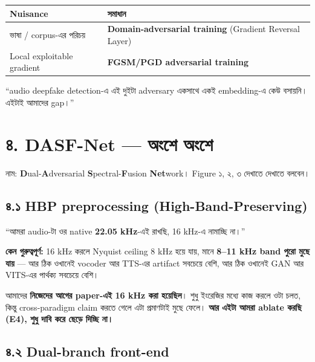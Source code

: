 \documentclass[11pt,a4paper]{article}
\newenvironment{say}{%
  \def\FrameCommand{\textcolor{barcol}{\vrule width 3pt}\hspace{8pt}}%
  \MakeFramed{\advance\hsize-\width \FrameRestore}%
}{\endMakeFramed}
\begin{document}
\begin{center}
\begin{tabularx}{\textwidth}{@{}>{\raggedright\arraybackslash}X >{\raggedright\arraybackslash}X@{}}
\toprule
\textbf{Nuisance} & \textbf{সমাধান} \\
\midrule
ভাষা / corpus-এর পরিচয় & \textbf{Domain-adversarial training} (Gradient Reversal Layer) \\
Local exploitable gradient & \textbf{FGSM/PGD adversarial training} \\
\bottomrule
\end{tabularx}
\end{center}

\begin{say}
``audio deepfake detection-এ এই দুইটা adversary একসাথে একই embedding-এ কেউ
বসায়নি। এইটাই আমাদের gap।''
\end{say}

\section*{৪. DASF-Net --- অংশে অংশে}

নাম: \textbf{D}ual-\textbf{A}dversarial \textbf{S}pectral-\textbf{F}usion
\textbf{Net}work। Figure ১, ২, ৩ দেখাতে দেখাতে বলবেন।

\subsection*{৪.১ HBP preprocessing (High-Band-Preserving)}

\begin{say}
``আমরা audio-টা ওর native \textbf{22.05 kHz}-এই রাখছি, 16 kHz-এ নামাচ্ছি না।''
\end{say}

\textbf{কেন গুরুত্বপূর্ণ:} 16 kHz করলে Nyquist ceiling 8 kHz হয়ে যায়, মানে
\textbf{8--11 kHz band পুরো মুছে যায়} --- আর ঠিক ওখানেই vocoder আর TTS-এর
artifact সবচেয়ে বেশি, আর ঠিক ওখানেই GAN আর VITS-এর পার্থক্য সবচেয়ে বেশি।

আমাদের \textbf{নিজেদের আগের paper-এই 16 kHz করা হয়েছিল}। শুধু ইংরেজির মধ্যে কাজ
করলে ওটা চলত, কিন্তু cross-paradigm claim করতে গেলে এটা প্রমাণটাই মুছে ফেলে।
\textbf{আর এইটা আমরা ablate করছি (E4), শুধু দাবি করে ছেড়ে দিচ্ছি না।}

\subsection*{৪.২ Dual-branch front-end}
\end{document}
